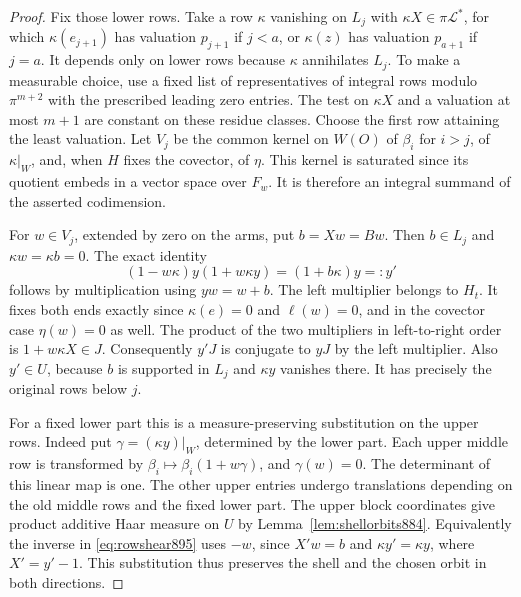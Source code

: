 \documentclass[a4paper,11pt]{article}
\theoremstyle{definition}
\theoremstyle{remark}
\numberwithin{equation}{section}
\begin{document}
\begin{proof}
Fix those lower rows. Take a row \(\kappa\) vanishing on \(L_j\)
with \(\kappa X\in\pi\mathcal L^*\), for which
\(\kappa(e_{j+1})\) has valuation \(p_{j+1}\) if \(j<a\), or
\(\kappa(z)\) has valuation \(p_{a+1}\) if \(j=a\).
It depends only on lower rows because \(\kappa\) annihilates
\(L_j\). To make a measurable choice, use a fixed list of
representatives of integral rows modulo \(\pi^{m+2}\) with the
prescribed leading zero entries. The test on \(\kappa X\) and a
valuation at most \(m+1\) are constant on these residue classes.
Choose the first row attaining the least valuation.
Let \(V_j\) be the common kernel on \(W(O)\) of \(\beta_i\)
for \(i>j\), of \(\kappa|_W\), and, when \(H\) fixes the
covector, of \(\eta\). This kernel is saturated since its
quotient embeds in a vector space over \(F_w\). It is therefore
an integral summand of the asserted codimension.

For \(w\in V_j\), extended by zero on the arms, put \(b=Xw=Bw\).
Then \(b\in L_j\) and \(\kappa w=\kappa b=0\). The exact identity
\begin{equation}
 (1-w\kappa)y(1+w\kappa y)=(1+b\kappa)y=:y'
 \label{eq:rowshear895}
\end{equation}
follows by multiplication using \(yw=w+b\). The left multiplier
belongs to \(H_t\). It fixes both ends exactly since
\(\kappa(e)=0\) and \(\ell(w)=0\), and in the covector case
\(\eta(w)=0\) as well. The product of the two multipliers in
left-to-right order is \(1+w\kappa X\in J\). Consequently \(y'J\)
is conjugate to \(yJ\) by the left multiplier. Also \(y'\in U\),
because \(b\) is supported in \(L_j\) and \(\kappa y\) vanishes
there. It has precisely the original rows below \(j\).

For a fixed lower part this is a measure-preserving substitution
on the upper rows. Indeed put \(\gamma=(\kappa y)|_W\), determined
by the lower part. Each upper middle row is transformed by
\(\beta_i\mapsto\beta_i(1+w\gamma)\), and \(\gamma(w)=0\).
The determinant of this linear map is one. The other upper
entries undergo translations depending on the old middle rows
and the fixed lower part. The upper block coordinates give
product additive Haar measure on \(U\) by
Lemma~\ref{lem:shellorbits884}. Equivalently the inverse in
\eqref{eq:rowshear895} uses \(-w\), since \(X'w=b\) and
\(\kappa y'=\kappa y\), where \(X'=y'-1\). This substitution
thus preserves the shell and the chosen orbit in both directions.


\end{proof}
\end{document}
